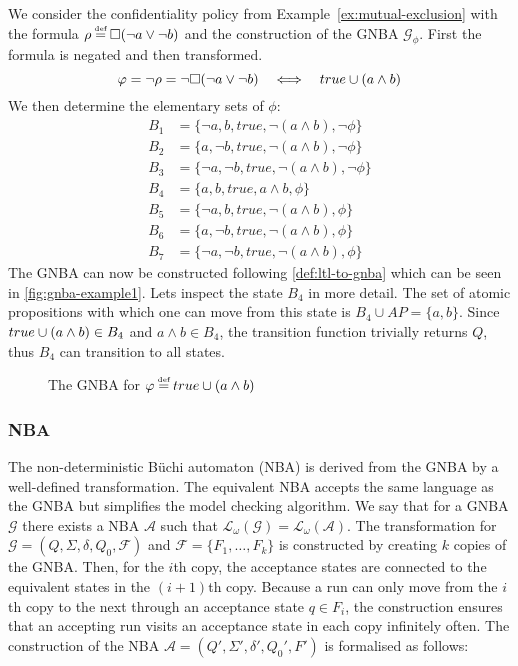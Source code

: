 \begin{example}
We consider the confidentiality policy from Example~\ref{ex:mutual-exclusion} with the formula $\conf \eqdef \G(\lnot a \lor \lnot b)$ and the construction of the GNBA $\mathcal{G}_\phi$. First the formula is negated and then transformed.
\begin{equation*}
    \varphi = \lnot \rho = \lnot \square(\lnot a \lor \lnot b) \quad\Longleftrightarrow\quad true \cup (a \land b)
\end{equation*}
We then determine the elementary sets of $\phi$:
\begin{align*}
    B_1 &= \{\lnot a, b, true, \lnot(a \land b), \lnot\phi\} \\
    B_2 &= \{a, \lnot b, true, \lnot(a \land b), \lnot\phi\} \\
    B_3 &= \{\lnot a, \lnot b, true, \lnot(a \land b), \lnot\phi\} \\
    B_4 &= \{a, b, true, a \land b, \phi\} \\
    B_5 &= \{\lnot a, b, true, \lnot(a \land b), \phi\} \\
    B_6 &= \{a, \lnot b, true, \lnot(a \land b), \phi\} \\
    B_7 &= \{\lnot a, \lnot b, true, \lnot(a \land b), \phi\}
\end{align*}
The GNBA can now be constructed following \autoref{def:ltl-to-gnba} which can be seen in \autoref{fig:gnba-example1}. Lets inspect the state $B_4$ in more detail. The set of atomic propositions with which one can move from this state is $B_4 \cup AP = \{a,b\}$. Since $true \cup (a \land b) \in B_4$ and $a \land b \in B_4$, the transition function trivially returns $Q$, thus $B_4$ can transition to all states.

\begin{figure}[!ht]
    \centering
    
    \caption{The GNBA for $\phi \eqdef true\U (a \land b)$}
    \label{fig:gnba-example1}
\end{figure}
\end{example}

\subsubsection{NBA}
The non-deterministic Büchi automaton (NBA) is derived from the GNBA by a well-defined transformation. The equivalent NBA accepts the same language as the GNBA but simplifies the model checking algorithm. We say that for a GNBA $\mathcal{G}$ there exists a NBA $\mathcal{A}$ such that $\mathcal{L}_\omega(\mathcal{G})=\mathcal{L}_\omega(\mathcal{A})$. The transformation for $\mathcal{G}=(Q,\Sigma,\delta,Q_0,\mathcal{F})$ and $\mathcal{F}=\{F_1,\ldots,F_k\}$ is constructed by creating $k$ copies of the GNBA. Then, for the $i$th copy, the acceptance states are connected to the equivalent states in the $(i+1)$th copy. Because a run can only move from the $i$th copy to the next through an acceptance state $q \in F_i$, the construction ensures that an accepting run visits an acceptance state in each copy infinitely often. The construction of the NBA $\mathcal{A}=(Q',\Sigma',\delta',Q_0',F')$ is formalised as follows:


